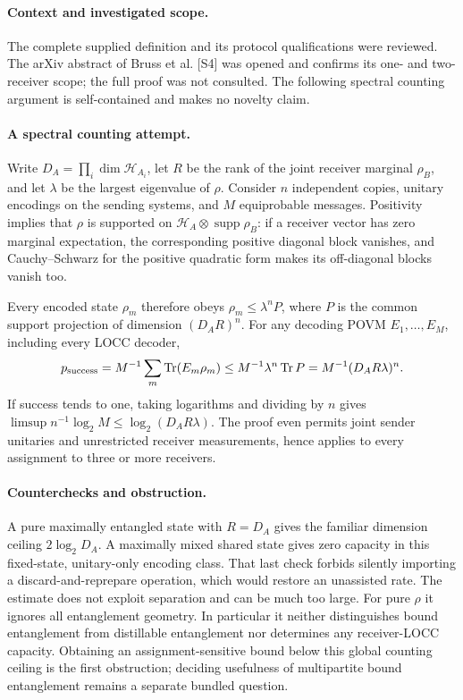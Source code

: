 \documentclass[11pt]{article}
\begin{document}
\paragraph{Context and investigated scope.} The complete supplied definition and its protocol qualifications were reviewed. The arXiv abstract of Bruss et al. [S4] was opened and confirms its one- and two-receiver scope; the full proof was not consulted. The following spectral counting argument is self-contained and makes no novelty claim.

\paragraph{A spectral counting attempt.} Write $D_A=\prod_i\dim\mathcal H_{A_i}$, let $R$ be the rank of the joint receiver marginal $\rho_B$, and let $\lambda$ be the largest eigenvalue of $\rho$. Consider $n$ independent copies, unitary encodings on the sending systems, and $M$ equiprobable messages. Positivity implies that $\rho$ is supported on $\mathcal H_A\otimes\operatorname{supp}\rho_B$: if a receiver vector has zero marginal expectation, the corresponding positive diagonal block vanishes, and Cauchy--Schwarz for the positive quadratic form makes its off-diagonal blocks vanish too.

Every encoded state $\rho_m$ therefore obeys $\rho_m\leq\lambda^n P$, where $P$ is the common support projection of dimension $(D_AR)^n$. For any decoding POVM $E_1,\ldots,E_M$, including every LOCC decoder,
\[
 p_{\rm success}=M^{-1}\sum_m\operatorname{Tr}(E_m\rho_m)
 \leq M^{-1}\lambda^n\operatorname{Tr}P
 =M^{-1}(D_AR\lambda)^n.
\]
If success tends to one, taking logarithms and dividing by $n$ gives $\limsup n^{-1}\log_2M\leq\log_2(D_AR\lambda)$. The proof even permits joint sender unitaries and unrestricted receiver measurements, hence applies to every assignment to three or more receivers.

\paragraph{Counterchecks and obstruction.} A pure maximally entangled state with $R=D_A$ gives the familiar dimension ceiling $2\log_2D_A$. A maximally mixed shared state gives zero capacity in this fixed-state, unitary-only encoding class. That last check forbids silently importing a discard-and-reprepare operation, which would restore an unassisted rate. The estimate does not exploit separation and can be much too large. For pure $\rho$ it ignores all entanglement geometry. In particular it neither distinguishes bound entanglement from distillable entanglement nor determines any receiver-LOCC capacity. Obtaining an assignment-sensitive bound below this global counting ceiling is the first obstruction; deciding usefulness of multipartite bound entanglement remains a separate bundled question.
\end{document}
